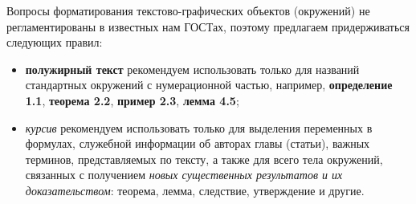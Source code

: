 Вопросы форматирования текстово-графических объектов (окружений) не регламентированы в известных нам ГОСТах, поэтому предлагаем придерживаться следующих правил:

\begin{itemize}
	\item \textbf{полужирный текст} рекомендуем использовать только для названий стандартных окружений с нумерационной частью, например, \textbf{определение 1.1}, \textbf{теорема 2.2}, \textbf{пример 2.3}, \textbf{лемма 4.5};
	
	\item \textit{курсив} рекомендуем использовать только для выделения переменных в формулах, служебной информации об авторах главы (статьи), важных терминов, представляемых по тексту, а также для всего тела окружений, связанных с получением \textit{новых существенных результатов и их доказательством}: теорема, лемма, следствие, утверждение и другие.
\end{itemize}

